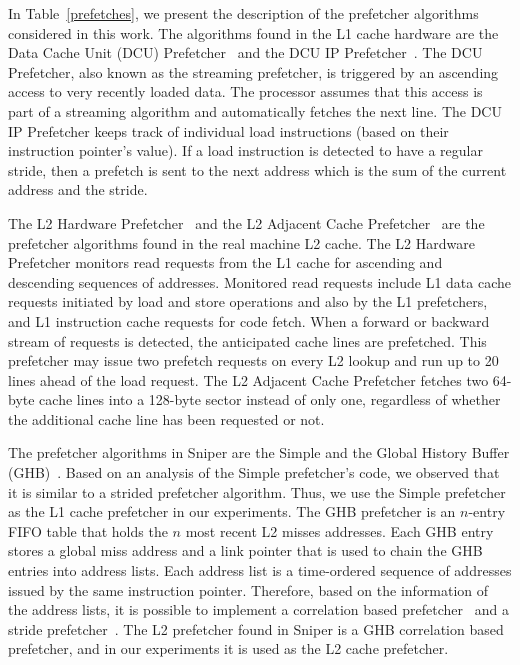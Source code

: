 \documentclass[AMA,final,STIX1COL]{WileyNJD-v2}
\begin{document}
In Table~\ref{prefetches}, we present the description of the prefetcher algorithms considered in this work. 
The algorithms found in the L1 cache hardware are the Data Cache Unit (DCU) Prefetcher~\cite{intelmanual} and the DCU IP Prefetcher~\cite{intelmanual}.
The DCU Prefetcher, also known as the streaming prefetcher, is triggered by an ascending access to very recently loaded data. 
The processor assumes that this access is part of a streaming algorithm and automatically fetches the next line.
The DCU IP Prefetcher keeps track of individual load instructions (based on their instruction pointer's value). 
If a load instruction is detected to have a regular stride, then a prefetch is sent to the next address which is the sum of the current address and the stride.

The L2 Hardware Prefetcher~\cite{intelmanual} and the L2 Adjacent Cache Prefetcher~\cite{intelmanual} are the prefetcher algorithms found in the real machine L2 cache.
The L2 Hardware Prefetcher monitors read requests from the L1 cache for ascending and descending sequences of addresses. 
Monitored read requests include L1 data cache requests initiated by load and store operations and also by the L1 prefetchers, and L1 instruction cache requests for code fetch.
When a forward or backward stream of requests is detected, the anticipated cache lines are prefetched.
This prefetcher may issue two prefetch requests on every L2 lookup and run up to 20 lines ahead of the load request. 
The L2 Adjacent Cache Prefetcher fetches two 64-byte cache lines into a 128-byte sector instead of only one, regardless of whether the additional cache line has been requested or not.

The prefetcher algorithms in Sniper are the Simple and the Global History Buffer (GHB)~\cite{nesbit2004data}.
Based on an analysis of the Simple prefetcher's code, we observed that it is similar to a strided prefetcher algorithm.
Thus, we use the Simple prefetcher as the L1 cache prefetcher in our experiments.
The GHB prefetcher is an $n$-entry FIFO table that holds the $n$ most recent L2 misses addresses. 
Each GHB entry stores a global miss address and a link pointer that is used to chain the GHB entries into address lists. 
Each address list is a time-ordered sequence of addresses issued by the same instruction pointer.
Therefore, based on the information of the address lists, it is possible to implement a correlation based prefetcher~\cite{charney1995GeneralizedCB} and a stride prefetcher~\cite{nesbit2004data}.
The L2 prefetcher found in Sniper is a GHB correlation based prefetcher, and in our experiments it is used as the L2 cache prefetcher.
\end{document}
